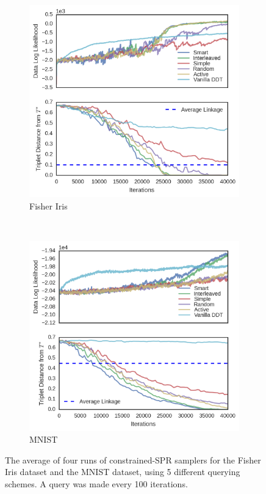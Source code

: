 \begin{figure}
    \centering
    \begin{subfigure}[]{0.7\textwidth}
        \centering
        \includegraphics[width=\textwidth]{img/ibhc/Fisher-Iris-result.png} \caption{Fisher Iris}
        \label{fig:iris-result}
    \end{subfigure}
    \\
    \begin{subfigure}[]{0.7\textwidth}
        \centering
        \includegraphics[width=\textwidth]{img/ibhc/MNIST-result.png}
        \caption{MNIST}
        \label{fig:mnist-result}
    \end{subfigure}
    \caption{The average of four runs of constrained-SPR samplers
    for the Fisher Iris dataset and the MNIST dataset, using 5 different querying schemes. A query was made every 100 iterations.}
    \label{fig:main-results}
\end{figure}

